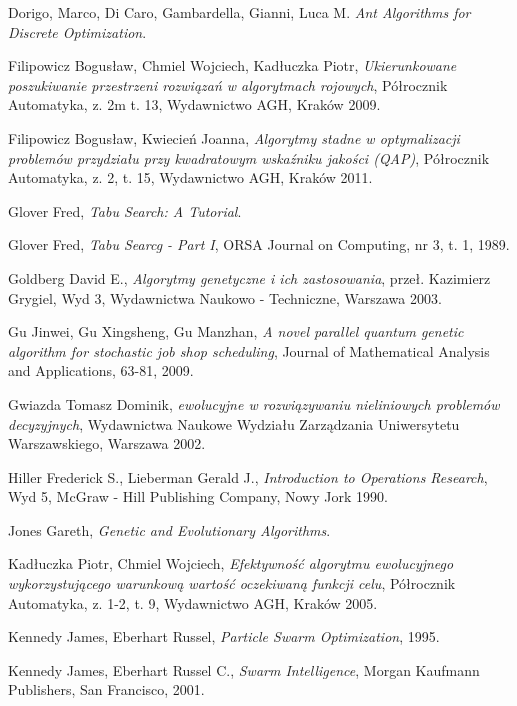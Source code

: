 

\begin{thebibliography}{99}

 Dorigo, Marco, Di Caro, Gambardella, Gianni, Luca M. \textit{Ant Algorithms for Discrete Optimization}.

 Filipowicz Bogusław, Chmiel Wojciech, Kadłuczka Piotr, \textit{Ukierunkowane poszukiwanie przestrzeni rozwiązań w algorytmach rojowych}, Półrocznik Automatyka, z. 2m t. 13, Wydawnictwo AGH, Kraków 2009.

 Filipowicz Bogusław, Kwiecień Joanna, \textit{Algorytmy stadne w optymalizacji problemów przydziału przy kwadratowym wskaźniku jakości (QAP)}, Półrocznik Automatyka, z. 2, t. 15, Wydawnictwo AGH, Kraków 2011.

 Glover Fred, \textit{Tabu Search: A Tutorial}.

 Glover Fred, \textit{Tabu Searcg - Part I}, ORSA Journal on Computing, nr 3, t. 1, 1989.

 Goldberg David E., \textit{Algorytmy genetyczne i ich zastosowania}, przeł. Kazimierz Grygiel, Wyd 3, Wydawnictwa Naukowo - Techniczne, Warszawa 2003.

 Gu Jinwei, Gu Xingsheng, Gu Manzhan, \textit{A novel parallel quantum genetic algorithm for stochastic job shop scheduling}, Journal of Mathematical Analysis and Applications, 63-81, 2009.

 Gwiazda Tomasz Dominik, \textit{ ewolucyjne w rozwiązywaniu nieliniowych problemów decyzyjnych}, Wydawnictwa Naukowe Wydziału Zarządzania Uniwersytetu Warszawskiego, Warszawa 2002.

 Hiller Frederick S., Lieberman Gerald J., \textit{Introduction to Operations Research}, Wyd 5, McGraw - Hill Publishing Company, Nowy Jork 1990.

 Jones Gareth, \textit{Genetic and Evolutionary Algorithms}.

 Kadłuczka Piotr, Chmiel Wojciech, \textit{Efektywność algorytmu ewolucyjnego wykorzystującego warunkową wartość oczekiwaną funkcji celu}, Półrocznik Automatyka, z. 1-2, t. 9, Wydawnictwo AGH, Kraków 2005.

 Kennedy James, Eberhart Russel, \textit{Particle Swarm Optimization}, 1995.

 Kennedy James, Eberhart Russel C., \textit{Swarm Intelligence}, Morgan Kaufmann Publishers, San Francisco, 2001.


\end{thebibliography}
